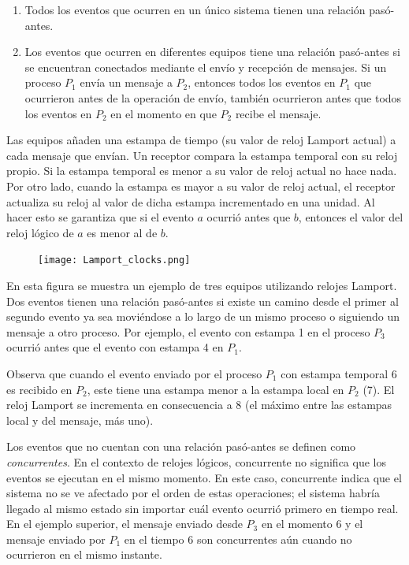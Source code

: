 \documentclass[12pt]{article}
\begin{document}
\begin{enumerate}
   \item Todos los eventos que ocurren en un único sistema tienen una relación pasó-antes.

   \item Los eventos que ocurren en diferentes equipos tiene una relación pasó-antes si se encuentran conectados mediante el envío y recepción de mensajes.
   Si un proceso $P_1$ envía un mensaje a $P_2$, 
   entonces todos los eventos en $P_1$ que ocurrieron antes de la operación de envío, 
   también ocurrieron antes que todos los eventos en $P_2$ en el momento en que $P_2$ recibe el mensaje.
\end{enumerate}

Las equipos añaden una estampa de tiempo (su valor de reloj Lamport actual) a cada mensaje que envían. 
Un receptor compara la estampa temporal con su reloj propio.
Si la estampa temporal es menor a su valor de reloj actual no hace nada.
Por otro lado, 
cuando la estampa es mayor a su valor de reloj actual,
el receptor actualiza su reloj al valor de dicha estampa incrementado en una unidad.
Al hacer esto se garantiza que si el evento $a$ ocurrió antes que $b$,
entonces el valor del reloj lógico de $a$ es menor al de $b$.

\begin{figure}[h]
   \centering
   \texttt{[image: Lamport\_clocks.png]}
\end{figure}

En esta figura se muestra un ejemplo de tres equipos utilizando relojes Lamport.
Dos eventos tienen una relación pasó-antes si existe un camino desde el primer al segundo evento ya sea moviéndose a lo largo de un mismo proceso o siguiendo un mensaje a otro proceso.
Por ejemplo, el evento con estampa 1 en el proceso $P_3$ ocurrió antes que el evento con estampa 4 en $P_1$.

Observa que cuando el evento enviado por el proceso $P_1$ con estampa temporal 6 es recibido en $P_2$,
este tiene una estampa menor a la estampa local en $P_2$ (7).
El reloj Lamport se incrementa en consecuencia a 8 (el máximo entre las estampas local y del mensaje, más uno).

Los eventos que no cuentan con una relación pasó-antes se definen como \emph{concurrentes}.
En el contexto de relojes lógicos,
concurrente no significa que los eventos se ejecutan en el mismo momento.
En este caso, concurrente indica que el sistema no se ve afectado por el orden de estas operaciones;
el sistema habría llegado al mismo estado sin importar cuál evento ocurrió primero en tiempo real.
En el ejemplo superior, el mensaje enviado desde $P_3$ en el momento 6 y el mensaje enviado por $P_1$ en el tiempo 6 son concurrentes aún cuando no ocurrieron en el mismo instante.
\end{document}

